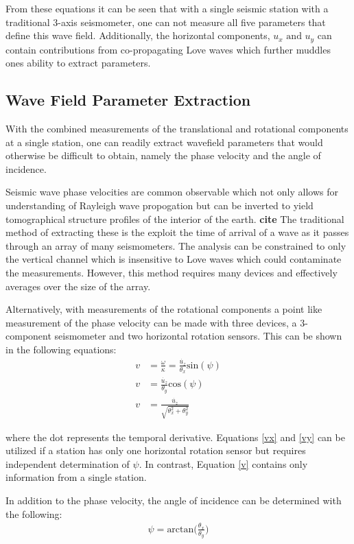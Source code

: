 \documentclass [12pt, proquest]{uwthesis}[2019]
\begin{document}
From these equations it can be seen that with a single seismic station with a traditional 3-axis seismometer, one can not measure all five parameters that define this wave field. Additionally, the horizontal components, $u_x\text{ and }u_y$ can contain contributions from co-propagating Love waves which further muddles ones ability to extract parameters. 

\subsection{Wave Field Parameter Extraction}

With the combined measurements of the translational and rotational components at a single station, one can readily extract wavefield parameters that would otherwise be difficult to obtain, namely the phase velocity and the angle of incidence. 

Seismic wave phase velocities are common observable which not only allows for understanding of Rayleigh wave propogation but can be inverted to yield tomographical structure profiles of the interior of the earth. \textbf{cite} The traditional method of extracting these is the exploit the time of arrival of a wave as it passes through an array of many seismometers. The analysis can be constrained to only the vertical channel which is insensitive to Love waves which could contaminate the measurements. However, this method requires many devices and effectively averages over the size of the array.

Alternatively, with measurements of the rotational components a point like measurement of the phase velocity can be made with three devices, a 3-component seismometer and two horizontal rotation sensors. This can be shown in the following equations:
\begin{align} 
v&=\frac{\omega}{\kappa} = \frac{\dot{u_z}}{\theta_x}\text{sin}(\psi) \label{vx} \\
v&=\frac{\dot{u_z}}{\theta_y}\text{cos}(\psi)\label{vy} \\
v&=\frac{\dot{u_z}}{\sqrt{\theta_x^2+\theta_y^2}} \label{v}
\end{align}

where the dot represents the temporal derivative. Equations \ref{vx} and \ref{vy} can be utilized if a station has only one horizontal rotation sensor but requires independent determination of $\psi$. In contrast, Equation \ref{v} contains only information from a single station.

In addition to the phase velocity, the angle of incidence can be determined with the following:
\begin{align}
\psi=\text{arctan}\bigg(\frac{\theta_x}{\theta_y}\bigg)
\end{align}
\end{document}
